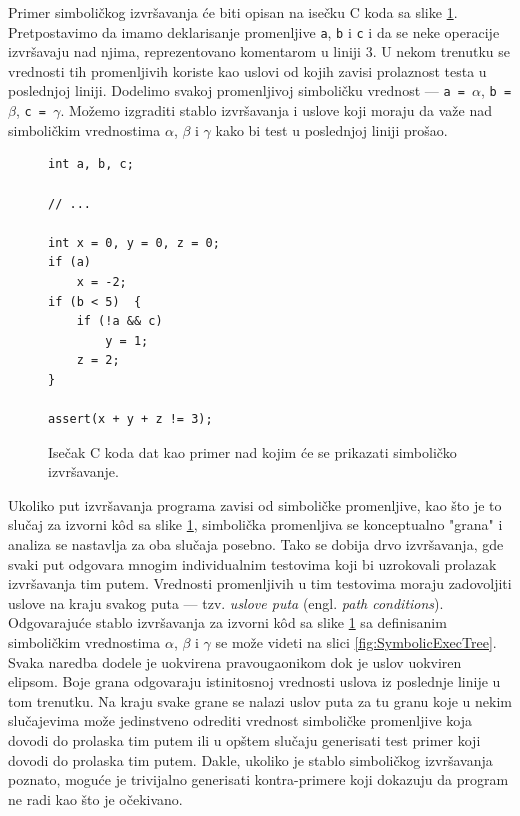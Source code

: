 Primer simboličkog izvršavanja će biti opisan na isečku C koda sa slike \ref{fig:SymbolicExecCode}. Pretpostavimo da imamo deklarisanje promenljive \texttt{a}, \texttt{b} i \texttt{c} i da se neke operacije izvršavaju nad njima, reprezentovano komentarom u liniji $3$. U nekom trenutku se vrednosti tih promenljivih koriste kao uslovi od kojih zavisi prolaznost testa u poslednjoj liniji. Dodelimo svakoj promenljivoj simboličku vrednost --- \texttt{a = }$\alpha$, \texttt{b = }$\beta$, \texttt{c = }$\gamma$. Možemo izgraditi stablo izvršavanja i uslove koji moraju da važe nad simboličkim vrednostima $\alpha$, $\beta$ i $\gamma$ kako bi test u poslednjoj liniji prošao.

\begin{figure}[h!]
\begin{lstlisting}[language={}]
int a, b, c;

// ...

int x = 0, y = 0, z = 0;
if (a)      
    x = -2;
if (b < 5)  {
    if (!a && c)    
        y = 1;
    z = 2;
}

assert(x + y + z != 3);
\end{lstlisting}
\caption{Isečak C koda dat kao primer nad kojim će se prikazati simboličko izvršavanje.}
\label{fig:SymbolicExecCode}
\end{figure}

Ukoliko put izvršavanja programa zavisi od simboličke promenljive, kao što je to slučaj za izvorni k\^od sa slike \ref{fig:SymbolicExecCode}, simbolička promenljiva se konceptualno "grana" i analiza se nastavlja za oba slučaja posebno. Tako se dobija drvo izvršavanja, gde svaki put odgovara mnogim individualnim testovima koji bi uzrokovali prolazak izvršavanja tim putem. Vrednosti promenljivih u tim testovima moraju zadovoljiti uslove na kraju svakog puta --- tzv. \emph{uslove puta} (engl. \emph{path conditions}). Odgovarajuće stablo izvršavanja za izvorni k\^od sa slike \ref{fig:SymbolicExecCode} sa definisanim simboličkim vrednostima $\alpha$, $\beta$ i $\gamma$ se može videti na slici \ref{fig:SymbolicExecTree}. Svaka naredba dodele je uokvirena pravougaonikom dok je uslov uokviren elipsom. Boje grana odgovaraju istinitosnoj vrednosti uslova iz poslednje linije u tom trenutku. Na kraju svake grane se nalazi uslov puta za tu granu koje u nekim slučajevima može jedinstveno odrediti vrednost simboličke promenljive koja dovodi do prolaska tim putem ili u opštem slučaju generisati test primer koji dovodi do prolaska tim putem. Dakle, ukoliko je stablo simboličkog izvršavanja poznato, moguće je trivijalno generisati kontra-primere koji dokazuju da program ne radi kao što je očekivano.


